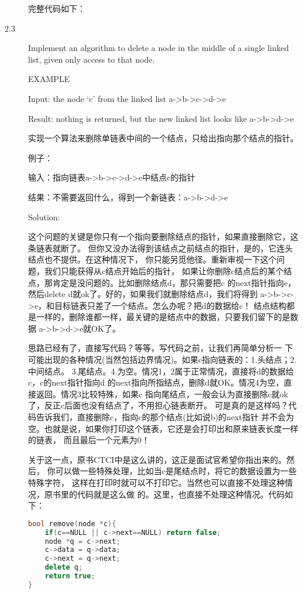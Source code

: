 \begin{description}
完整代码如下：




\item[2.3] Implement an algorithm to delete a node in the middle of a single linked list, given only access to that node.

EXAMPLE

Input: the node ‘c’ from the linked list a->b->c->d->e

Result: nothing is returned, but the new linked list looks like a->b->d->e

实现一个算法来删除单链表中间的一个结点，只给出指向那个结点的指针。

例子：

输入：指向链表a->b->c->d->e中结点c的指针

结果：不需要返回什么，得到一个新链表：a->b->d->e

Solution: 

这个问题的关键是你只有一个指向要删除结点的指针，如果直接删除它，这条链表就断了。 但你又没办法得到该结点之前结点的指针，是的，它连头结点也不提供。在这种情况下， 你只能另觅他径。重新审视一下这个问题，我们只能获得从c结点开始后的指针， 如果让你删除c结点后的某个结点，那肯定是没问题的。比如删除结点d，那只需要把c 的next指针指向e，然后delete d就ok了。好的，如果我们就删除结点d，我们将得到 a->b->c->e，和目标链表只差了一个结点。怎么办呢？把d的数据给c！ 结点结构都是一样的，删除谁都一样，最关键的是结点中的数据，只要我们留下的是数据 a->b->d->e就OK了。

思路已经有了，直接写代码？等等，写代码之前，让我们再简单分析一 下可能出现的各种情况(当然包括边界情况)。如果c指向链表的：1.头结点；2.中间结点。 3.尾结点。4.为空。情况1，2属于正常情况，直接将d的数据给c，c的next指针指向d 的next指向所指结点，删除d就OK。情况4为空，直接返回。情况3比较特殊，如果c 指向尾结点，一般会认为直接删除c就ok了，反正c后面也没有结点了，不用担心链表断开。 可是真的是这样吗？代码告诉我们，直接删除c，指向c的那个结点(比如说b)的next指针 并不会为空。也就是说，如果你打印这个链表，它还是会打印出和原来链表长度一样的链表， 而且最后一个元素为0！

关于这一点，原书CTCI中是这么讲的，这正是面试官希望你指出来的。然后， 你可以做一些特殊处理，比如当c是尾结点时，将它的数据设置为一些特殊字符， 这样在打印时就可以不打印它。当然也可以直接不处理这种情况，原书里的代码就是这么做 的。这里，也直接不处理这种情况。代码如下：

\begin{lstlisting}[language=C++]
bool remove(node *c){
    if(c==NULL || c->next==NULL) return false;
    node *q = c->next;
    c->data = q->data;
    c->next = q->next;
    delete q;
    return true;
}
\end{lstlisting}


\end{description}
